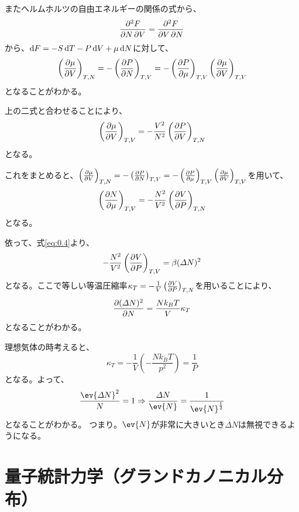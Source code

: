 \documentclass[titlepage]{ltjsarticle}
\begin{document}
またヘルムホルツの自由エネルギーの関係の式から、
\begin{equation}
  \pdv{F}{N,V} = \pdv{F}{V,N} 
\end{equation}
から、\(\odif{F}= -S \odif{T} -P \odif{V} + \mu \odif{N}\)に対して、
\begin{equation}
  \left( \pdv{\mu}{V} \right)_{T,N} = - \left( \pdv{P}{N} \right)_{T,V} = - \left( \pdv{P}{\mu} \right)_{T,V}\left( \pdv{\mu}{V} \right)_{T,V}
\end{equation}
となることがわかる。

上の二式と合わせることにより、
\begin{equation}
  \left(\pdv{\mu}{V}\right)_{T,V} = - \frac{V^2}{N^2}\left( \pdv{P}{V} \right)_{T,N}
\end{equation}
となる。

これをまとめると、\(  \left( \pdv{\mu}{V} \right)_{T,N} = - \left( \pdv{P}{N} \right)_{T,V} = - \left( \pdv{P}{\mu} \right)_{T,V}\left( \pdv{\mu}{V} \right)_{T,V}\)を用いて、
\begin{equation}
  \left(\pdv{N}{\mu}\right)_{T,V} = - \frac{N^2}{V^2}\left( \pdv{V}{P} \right)_{T,N}
\end{equation}
となる。

依って、式\eqref{eq:0.4}より、
\begin{equation}
  -\frac{N^2}{V^2} \left( \pdv{V}{P} \right)_{T,V} = \beta (\varDelta N)^2
\end{equation}
となる。ここで等しい等温圧縮率\(\kappa_T = - \frac{1}{V}\left( \pdv{V}{P} \right)_{T,N}\)を用いることにより、
\begin{equation}
  \pdv{(\varDelta N)^2}{N} = \frac{Nk_BT}{V}\kappa_T 
\end{equation}
となることがわかる。

理想気体の時考えると、
\begin{equation}
  \kappa_T = -\frac{1}{V} \left(  -\frac{Nk_BT}{p^2} \right) = \frac{1}{P}
\end{equation}
となる。よって、
\begin{equation}
  \frac{\ev{\varDelta N}^2}{N} = 1  \Rightarrow \frac{\varDelta N}{\ev{N}} = \frac{1}{\ev{N}^{\frac{1}{2}}}
\end{equation}
となることがわかる。
つまり。\(\ev{N}\)が非常に大きいとき\(\varDelta N\)は無視できるようになる。


\section{量子統計力学（グランドカノニカル分布）}
\end{document}
